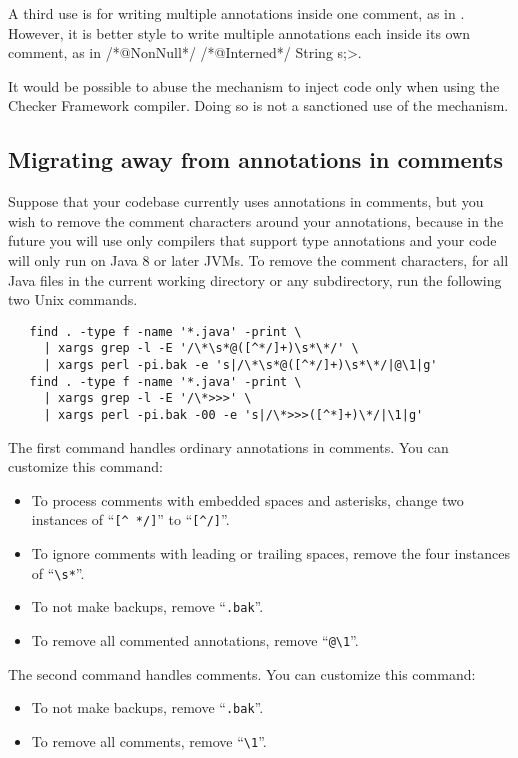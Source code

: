 A third use is for writing multiple annotations inside one
comment, as in .
However, it is better style to write multiple annotations each
inside its own comment, as in \</*@NonNull*/ /*@Interned*/ String s;>.

It would be possible to abuse the  mechanism to inject
code only when using
the Checker Framework compiler.  Doing so is not a sanctioned use of the
mechanism.


\subsection{Migrating away from annotations in comments\label{uncommenting-annotations}}

Suppose that your codebase currently uses annotations in comments, but you
wish to remove the comment characters around your annotations, because in
the future you will use only compilers that support type annotations and
your code will only run on Java 8 or later JVMs.
To remove
the comment characters, for all Java files in the current
working directory or any subdirectory, run the following two Unix commands.

\begin{Verbatim}
   find . -type f -name '*.java' -print \
     | xargs grep -l -E '/\*\s*@([^*/]+)\s*\*/' \
     | xargs perl -pi.bak -e 's|/\*\s*@([^*/]+)\s*\*/|@\1|g'
   find . -type f -name '*.java' -print \
     | xargs grep -l -E '/\*>>>' \
     | xargs perl -pi.bak -00 -e 's|/\*>>>([^*]+)\*/|\1|g'
\end{Verbatim}

The first command handles ordinary annotations in comments.
You can customize this command:
\begin{itemize}
\item
To process comments with embedded spaces and asterisks, change
two instances of ``\verb|[^ */]|'' to ``\verb|[^/]|''.
\item
To ignore comments with leading or trailing spaces, remove the four
instances of ``\verb|\s*|''.
\item
  To not make backups, remove ``\verb|.bak|''.
\item
  To remove all commented annotations, remove ``\verb|@\1|''.
\end{itemize}

The second command handles  comments.
You can customize this command:
\begin{itemize}
\item
  To not make backups, remove ``\verb|.bak|''.
\item
  To remove all  comments, remove ``\verb|\1|''.
\end{itemize}


